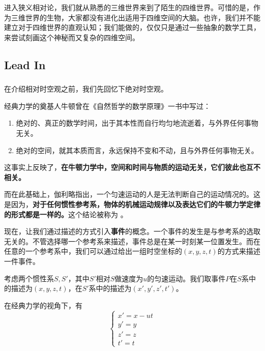 \chapter[狭义相对论]{}
进入狭义相对论，我们就从熟悉的三维世界来到了陌生的四维世界。可惜的是，作为三维世界的生物，大家都没有进化出适用于四维空间的大脑。也许，我们并不能建立对于四维世界的直观认知；我们能做的，仅仅只是通过一些抽象的数学工具，来尝试刻画这个神秘而又复杂的四维空间。
\section[引入]{Lead In}
\subsection[绝对时空观]{}
在介绍相对时空观之前，我们先回忆下绝对时空观。

经典力学的奠基人牛顿曾在《自然哲学的数学原理》一书中写过：
\begin{enumerate}
	\item 绝对的、真正的数学时间，出于其本性而自行均匀地流逝着，与外界任何事物无关。
	\item 绝对的空间，就其本质而言，永远保持不变和不动，且与外界任何事物无关。
\end{enumerate}

这事实上反映了，\textbf{在牛顿力学中，空间和时间与物质的运动无关，它们彼此也互不相关。}

而在此基础上，伽利略指出，一个匀速运动的人是无法判断自己的运动情况的。这是因为，\textbf{对于任何惯性参考系，物体的机械运动规律以及表达它们的牛顿力学定律的形式都是一样的。}这个结论被称为 。

现在，让我们通过描述的方式引入\textbf{事件}的概念。一个事件的发生是与参考系的选取无关的。不管选择哪一个参考系来描述，事件总是在某一时刻某一位置发生。而在任意的一个参考系中，我们可以通过给出一组时空坐标的$(x,y,z,t)$的方式来描述一件事件。


考虑两个惯性系$S,S'$，其中$S'$相对$S$做速度为$u$的匀速运动。我们取事件$P$在$S$系中的描述为$(x,y,z,t)$，在$S'$系中的描述为$(x',y',z',t')$。

在经典力学的视角下，有
\begin{equation}
	\left\{
	\begin{array}{l}
		x'=x-ut\\
		y'=y\\
		z'=z\\
		t'=t
	\end{array}
	\right.
\end{equation}

